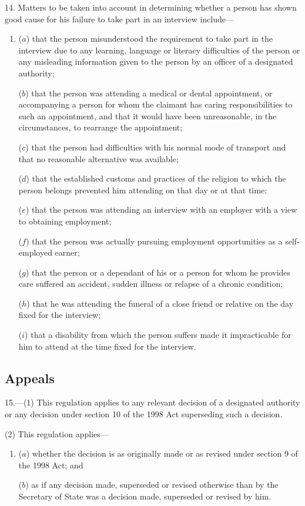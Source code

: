 \documentclass[12pt,a4paper]{article}
\begin{document}
14.  Matters to be taken into account in determining whether a person has shown good cause for his failure to take part in an interview include—
\begin{enumerate}\item[]
($a$) that the person misunderstood the requirement to take part in the interview due to any learning, language or literacy difficulties of the person or any misleading information given to the person by an officer of a designated authority;

($b$) that the person was attending a medical or dental appointment, or accompanying a person for whom the claimant has caring responsibilities to such an appointment, and that it would have been unreasonable, in the circumstances, to rearrange the appointment;

($c$)  that the person had difficulties with his normal mode of transport and that no reasonable alternative was available;

($d$) that the established customs and practices of the religion to which the person belongs prevented him attending on that day or at that time;

($e$) that the person was attending an interview with an employer with a view to obtaining employment;

($f$) that the person was actually pursuing employment opportunities as a self-employed earner;

($g$) that the person or a dependant of his or a person for whom he provides care suffered an accident, sudden illness or relapse of a chronic condition;

($h$) that he was attending the funeral of a close friend or relative on the day fixed for the interview;

($i$) that a disability from which the person suffers made it impracticable for him to attend at the time fixed for the interview.
\end{enumerate}

\subsection[15. Appeals]{Appeals}

15.---(1)  This regulation applies to any relevant decision of a designated authority or any decision under section 10 of the 1998 Act superseding such a decision.

(2) This regulation applies—
\begin{enumerate}\item[]
($a$) whether the decision is as originally made or as revised under section 9 of the 1998 Act; and

($b$) as if any decision made, superseded or revised otherwise than by the Secretary of State was a decision made, superseded or revised by him.
\end{enumerate}
\end{document}
